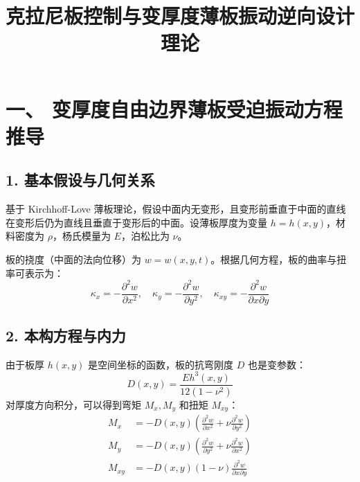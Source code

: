 \documentclass[11pt,a4paper]{article}
\title{\textbf{克拉尼板控制与变厚度薄板振动逆向设计理论}}
\author{}
\date{}
\begin{document}
\maketitle

\section*{一、 变厚度自由边界薄板受迫振动方程推导}

\subsection*{1. 基本假设与几何关系}
基于 Kirchhoff-Love 薄板理论，假设中面内无变形，且变形前垂直于中面的直线在变形后仍为直线且垂直于变形后的中面。设薄板厚度为变量 $h = h(x,y)$，材料密度为 $\rho$，杨氏模量为 $E$，泊松比为 $\nu$。

板的挠度（中面的法向位移）为 $w = w(x,y,t)$。根据几何方程，板的曲率与扭率可表示为：
\begin{equation}
    \kappa_x = -\frac{\partial^2 w}{\partial x^2}, \quad \kappa_y = -\frac{\partial^2 w}{\partial y^2}, \quad \kappa_{xy} = -\frac{\partial^2 w}{\partial x \partial y}
\end{equation}

\subsection*{2. 本构方程与内力}
由于板厚 $h(x,y)$ 是空间坐标的函数，板的抗弯刚度 $D$ 也是变参数：
\begin{equation}
    D(x,y) = \frac{E h^3(x,y)}{12(1-\nu^2)}
\end{equation}
对厚度方向积分，可以得到弯矩 $M_x, M_y$ 和扭矩 $M_{xy}$：
\begin{equation}
\begin{aligned} 
    M_x &= -D(x,y) \left( \frac{\partial^2 w}{\partial x^2} + \nu \frac{\partial^2 w}{\partial y^2} \right) \\ 
    M_y &= -D(x,y) \left( \frac{\partial^2 w}{\partial y^2} + \nu \frac{\partial^2 w}{\partial x^2} \right) \\ 
    M_{xy} &= -D(x,y) (1-\nu) \frac{\partial^2 w}{\partial x \partial y} 
\end{aligned}
\end{equation}
\end{document}
